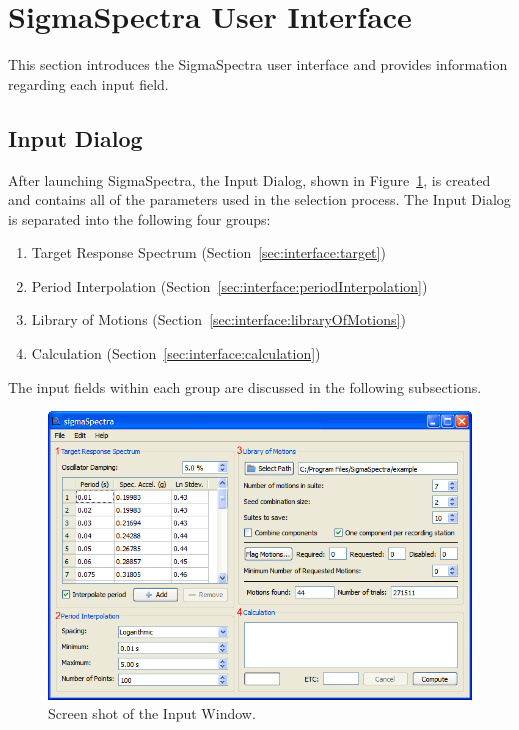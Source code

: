 \documentclass[11pt]{article}
\begin{document}
\section{SigmaSpectra User Interface}

This section introduces the SigmaSpectra user interface and provides information
regarding each input field.

\subsection{Input Dialog}

After launching SigmaSpectra, the Input Dialog, shown in
Figure~\ref{fig:interface:inputWindow}, is created and contains all of the
parameters used in the selection process. The Input Dialog is separated into the
following four groups:
\begin{enumerate}
  \item Target Response Spectrum (Section~\ref{sec:interface:target})
  \item Period Interpolation (Section~\ref{sec:interface:periodInterpolation})
  \item Library of Motions (Section~\ref{sec:interface:libraryOfMotions})
  \item Calculation (Section~\ref{sec:interface:calculation})
\end{enumerate}
The input fields within each group are discussed in the following subsections.

\begin{figure}
  \begin{center}
	\includegraphics[scale=0.7]{screenshots/inputWindow}
  \end{center}
  \caption{Screen shot of the Input Window.}
  \label{fig:interface:inputWindow}
\end{figure}
\end{document}
